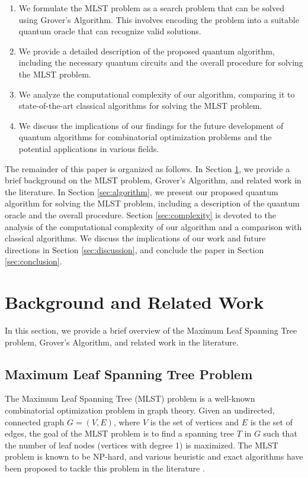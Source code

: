 \begin{enumerate}
    \item We formulate the MLST problem as a search problem that can be solved using Grover's Algorithm. This involves encoding the problem into a suitable quantum oracle that can recognize valid solutions.
    
    \item We provide a detailed description of the proposed quantum algorithm, including the necessary quantum circuits and the overall procedure for solving the MLST problem.
    
    \item We analyze the computational complexity of our algorithm, comparing it to state-of-the-art classical algorithms for solving the MLST problem.
    
    \item We discuss the implications of our findings for the future development of quantum algorithms for combinatorial optimization problems and the potential applications in various fields.
\end{enumerate}

The remainder of this paper is organized as follows. In Section \ref{sec:background}, we provide a brief background on the MLST problem, Grover's Algorithm, and related work in the literature. In Section \ref{sec:algorithm}, we present our proposed quantum algorithm for solving the MLST problem, including a description of the quantum oracle and the overall procedure. Section \ref{sec:complexity} is devoted to the analysis of the computational complexity of our algorithm and a comparison with classical algorithms. We discuss the implications of our work and future directions in Section \ref{sec:discussion}, and conclude the paper in Section \ref{sec:conclusion}.

\section{Background and Related Work} \label{sec:background}
In this section, we provide a brief overview of the Maximum Leaf Spanning Tree problem, Grover's Algorithm, and related work in the literature.

\subsection{Maximum Leaf Spanning Tree Problem}
The Maximum Leaf Spanning Tree (MLST) problem is a well-known combinatorial optimization problem in graph theory. Given an undirected, connected graph $G = (V, E)$, where $V$ is the set of vertices and $E$ is the set of edges, the goal of the MLST problem is to find a spanning tree $T$ in $G$ such that the number of leaf nodes (vertices with degree 1) is maximized. The MLST problem is known to be NP-hard, and various heuristic and exact algorithms have been proposed to tackle this problem in the literature \cite{4, 5, 6}.

